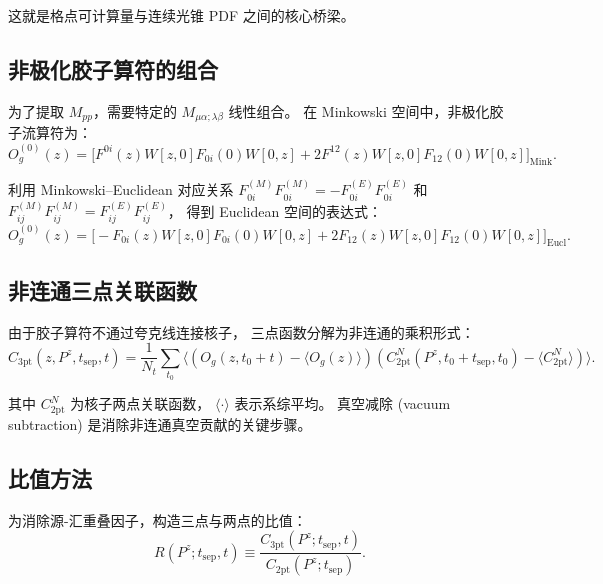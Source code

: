 \documentclass[12pt,a4paper]{ctexart}
\newcommand{\Pz}{P^{z}}
\newcommand{\tsep}{t_{\text{sep}}}
\begin{document}
这就是格点可计算量与连续光锥 PDF 之间的核心桥梁。

\subsection{非极化胶子算符的组合}

为了提取 $M_{pp}$，需要特定的 $M_{\mu\alpha;\lambda\beta}$ 线性组合。
在 Minkowski 空间中，非极化胶子流算符为\cite{note_of_gluon_PDFs}：
\begin{equation}\label{eq:Og_minkowski}
O^{(0)}_{g}(z) = \Big[ F^{0i}(z) W[z,0] F_{0i}(0) W[0,z]
    + 2 F^{12}(z) W[z,0] F_{12}(0) W[0,z] \Big]_{\text{Mink}}.
\end{equation}

利用 Minkowski--Euclidean 对应关系
$F^{(M)}_{0i} F^{(M)}_{0i} = -F^{(E)}_{0i} F^{(E)}_{0i}$ 和
$F^{(M)}_{ij} F^{(M)}_{ij} = F^{(E)}_{ij} F^{(E)}_{ij}$，
得到 Euclidean 空间的表达式\cite{gluon_pdf_derivation, 场强张量}：
\begin{equation}\label{eq:Og_euclidean}
\boxed{
O^{(0)}_{g}(z) = \Big[ -F_{0i}(z) W[z,0] F_{0i}(0) W[0,z]
    + 2 F_{12}(z) W[z,0] F_{12}(0) W[0,z] \Big]_{\text{Eucl}}.
}
\end{equation}

\subsection{非连通三点关联函数}

由于胶子算符不通过夸克线连接核子，
三点函数分解为非连通的乘积形式\cite{gluon_pdf_derivation}：
\begin{equation}\label{eq:C3pt_disc}
\boxed{
C_{\text{3pt}}(z, \Pz, \tsep, t)
    = \frac{1}{N_t} \sum_{t_0}
    \big\langle (O_g(z, t_0+t) - \langle O_g(z) \rangle)
    (C^{N}_{\text{2pt}}(\Pz, t_0+\tsep, t_0) - \langle C^{N}_{\text{2pt}} \rangle) \big\rangle.
}
\end{equation}

其中 $C^{N}_{\text{2pt}}$ 为核子两点关联函数，
$\langle \cdot \rangle$ 表示系综平均。
真空减除 (vacuum subtraction) 是消除非连通真空贡献的关键步骤。

\subsection{比值方法}

为消除源-汇重叠因子，构造三点与两点的比值\cite{gluon_pdf_derivation, 关联函数}：
\begin{equation}\label{eq:ratio_def}
\boxed{
R(\Pz; \tsep, t) \equiv \frac{C_{\text{3pt}}(\Pz; \tsep, t)}
    {C_{\text{2pt}}(\Pz; \tsep)}.
}
\end{equation}
\end{document}

